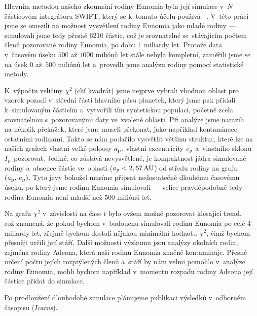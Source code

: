 \documentclass[A4paper, 12pt, oneside, openany]{book}
\begin{document}
Hlavním metodou našeho zkoumání rodiny Eunomia byla její simulace v~$N$ částicovém integrátoru SWIFT, který se k~tomuto účelu používá~\cite{levison94} \cite{broz11}. V~této práci jsme se omezili na možnost vysvětlení rodiny Eunomia jako mladé rodiny --- simulovali jsme tedy přesně 6210 částic, což je srovnatelné se~stávajícím počtem členů pozorované rodiny Eunomia, po dobu 1 miliardy let. Protože data v~časovém úseku $500$ až $1000$ miliónů let stále nebyla kompletní, zaměřili jsme se na úsek $0$ až~$500$ miliónů let a~provedli jsme analýzu rodiny pomocí statistické metody.

K~výpočtu veličiny $\chi^2$ (chí kvadrát) jsme nejprve vybrali vhodnou oblast pro vzorek pozadí v~střední části hlavního pásu planetek, který jsme pak přidali k~simulovaným částicím a~vytvořili tím syntetickou populaci, početně zcela srovnatelnou s~pozorovanými daty ve~zvolené oblasti. Při analýze jsme narazili na několik překážek, které jsme museli překonat, jako například kontaminace ostatními rodinami. Takto se nám podařilo vysvětlit většinu struktur, které lze na našich grafech vlastní velké poloosy $a_{\rm p}$, vlastní excentricity $e_{\rm p}$ a~vlastního sklonu $I_{\rm p}$ pozorovat. Jediné, co zůstává nevysvětlené, je kompaktnost jádra simulované rodiny a~absence částic ve~oblasti  ($a_{\rm p}<2,57\,{\rm AU}$) od středu rodiny na grafu $(a_{\rm p},\,e_{\rm p})$. Tyto jevy bohužel musíme připsat nedostatečně dlouhému časovému úseku, po který jsme rodinu Eunomia simulovali --- velice pravděpodobně tedy rodina Eunomia není mladší než $500$ miliónů let.

Na grafu $\chi^2$ v~závislosti na čase $t$ bylo ovšem možné pozorovat klesající trend, což znamená, že pokud bychom v~budoucnu simulovali rodinu Eunomia po celé 4 miliardy let, zřejmě bychom dostali nějakou minimální hodnotu $\chi^2$, čímž bychom přesněji určili její stáří. Další možnosti výzkumu jsou analýzy okolních rodin, zejména rodiny Adeona, která naši rodinu Eunomia značně kontaminuje. Přesné určení počtu jejích rozptýlených členů a~stáří by nám velmi pomohlo v~analýze rodiny Eunomia, mohli bychom například v~momentu rozpadu rodiny Adeona její částice přidat do simulace.

Po prodloužení dlouhodobé simulace plánujeme publikaci výsledků v~odborném časopisu (\textit{Icarus}).

\newpage
\end{document}
